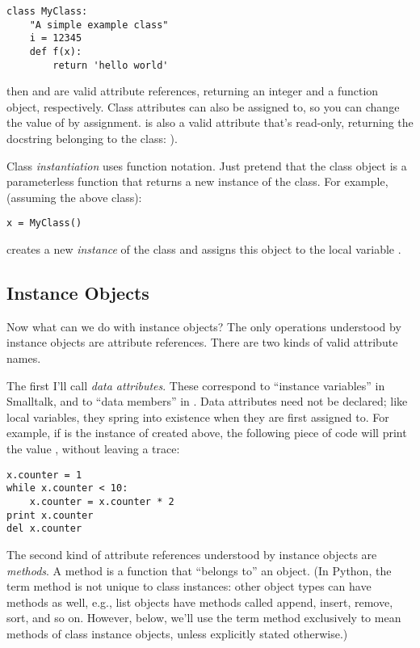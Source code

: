 \documentclass{manual}
\begin{document}
\begin{verbatim}
class MyClass:
    "A simple example class"
    i = 12345
    def f(x):
        return 'hello world'
\end{verbatim}

then  and  are valid attribute
references, returning an integer and a function object, respectively.
Class attributes can also be assigned to, so you can change the value
of  by assignment.   is also a valid
attribute that's read-only, returning the docstring belonging to
the class: ).  

Class \emph{instantiation} uses function notation.  Just pretend that
the class object is a parameterless function that returns a new
instance of the class.  For example, (assuming the above class):

\begin{verbatim}
x = MyClass()
\end{verbatim}

creates a new \emph{instance} of the class and assigns this object to
the local variable .


\subsection{Instance Objects}
\label{instanceObjects}

Now what can we do with instance objects?  The only operations
understood by instance objects are attribute references.  There are
two kinds of valid attribute names.

The first I'll call \emph{data attributes}.  These correspond to
``instance variables'' in Smalltalk, and to ``data members'' in
\Cpp{}.  Data attributes need not be declared; like local variables,
they spring into existence when they are first assigned to.  For
example, if  is the instance of  created above,
the following piece of code will print the value , without
leaving a trace:

\begin{verbatim}
x.counter = 1
while x.counter < 10:
    x.counter = x.counter * 2
print x.counter
del x.counter
\end{verbatim}

The second kind of attribute references understood by instance objects
are \emph{methods}.  A method is a function that ``belongs to'' an
object.  (In Python, the term method is not unique to class instances:
other object types can have methods as well, e.g., list objects have
methods called append, insert, remove, sort, and so on.  However,
below, we'll use the term method exclusively to mean methods of class
instance objects, unless explicitly stated otherwise.)
\end{document}
